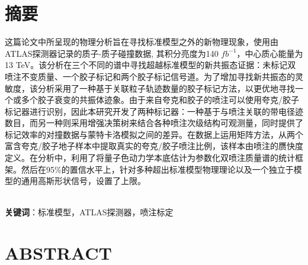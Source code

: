 \documentclass[UTF8,12pt]{ctexart}
\numberwithin{equation}{section}
\renewcommand{\rm}{\mathrm}
\begin{document}
		\newpage
		\pagestyle{fancy}
		\fancyhf{}
		\cfoot{$\bm{-\,\rm{\thepage}\,-}$}
		
		
		
		\section*{摘\quad 要}
		
\hspace{8mm}
这篇论文中所呈现的物理分析旨在寻找标准模型之外的新物理现象，使用由ATLAS探测器记录的质子-质子碰撞数据, 其积分亮度为140 $fb^{-1}$，中心质心能量为13 TeV。该分析在三个不同的谱中寻找超越标准模型的新共振态证据：未标记双喷注不变质量、一个胶子标记和两个胶子标记信号道。为了增加寻找新共振态的灵敏度，该分析采用了一种基于关联粒子轨迹数量的胶子标记方法，以更优地寻找一个或多个胶子衰变的共振体迹象。由于来自夸克和胶子的喷注可以使用夸克/胶子标记器进行识别，因此本研究开发了两种标记器：一种基于与喷注关联的带电径迹数目，而另一种则采用增强决策树来结合各种喷注次级结构可观测量，同时提供了标记效率的对撞数据与蒙特卡洛模拟之间的差异。在数据上运用矩阵方法，从两个富含夸克/胶子地子样本中提取真实的夸克/胶子喷注比例，该样本由喷注的赝快度定义。在分析中，利用了将量子色动力学本底估计为参数化双喷注质量谱的统计框架。然后在95\%的置信水平上，针对多种超出标准模型物理理论以及一个独立于模型的通用高斯形状信号，设置了上限。		
		
		
~\\
\textbf{关键词}：标准模型，ATLAS探测器，喷注标定

		
		
		


\newpage


\section*{\textbf{ABSTRACT}}

\hspace{8mm}
\end{document}

